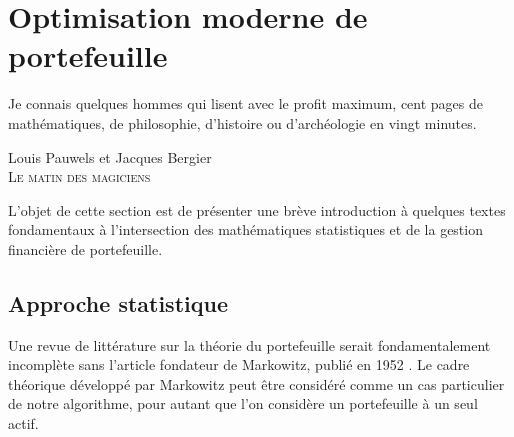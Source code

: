 \section{Optimisation moderne de portefeuille}
\label{sec:review}

\epigraph{Je connais quelques hommes qui lisent avec le profit maximum, cent pages de
  mathématiques, de philosophie, d’histoire ou d’archéologie en vingt minutes.}{Louis
  Pauwels et Jacques Bergier\\\textsc{Le matin des magiciens}}

L'objet de cette section est de présenter une brève introduction à quelques textes
fondamentaux à l'intersection des mathématiques statistiques et de la gestion financière
de portefeuille.




\subsection{Approche statistique}

Une revue de littérature sur la théorie du portefeuille serait fondamentalement incomplète
sans l'article fondateur de Markowitz, publié en 1952 \cite{markowitz1952portfolio}. Le
cadre théorique développé par Markowitz peut être considéré comme un cas particulier de
notre algorithme, pour autant que l'on considère un portefeuille à un seul actif.

